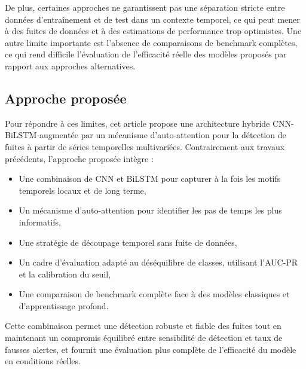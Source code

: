 De plus, certaines approches ne garantissent pas une séparation stricte entre
données d'entraînement et de test dans un contexte temporel, ce qui peut mener
à des fuites de données et à des estimations de performance trop optimistes.
Une autre limite importante est l'absence de comparaisons de benchmark complètes,
ce qui rend difficile l'évaluation de l'efficacité réelle des modèles proposés
par rapport aux approches alternatives.

\subsection{Approche proposée}

Pour répondre à ces limites, cet article propose une architecture hybride
CNN-BiLSTM augmentée par un mécanisme d'auto-attention pour la détection de
fuites à partir de séries temporelles multivariées. Contrairement aux travaux
précédents, l'approche proposée intègre :

\begin{itemize}
    \item Une combinaison de CNN et BiLSTM pour capturer à la fois les motifs temporels locaux et de long terme,
    \item Un mécanisme d'auto-attention pour identifier les pas de temps les plus informatifs,
    \item Une stratégie de découpage temporel sans fuite de données,
    \item Un cadre d'évaluation adapté au déséquilibre de classes, utilisant l'AUC-PR et la calibration du seuil,
    \item Une comparaison de benchmark complète face à des modèles classiques et d'apprentissage profond.
\end{itemize}

Cette combinaison permet une détection robuste et fiable des fuites tout en
maintenant un compromis équilibré entre sensibilité de détection et taux de
fausses alertes, et fournit une évaluation plus complète de l'efficacité du
modèle en conditions réelles.